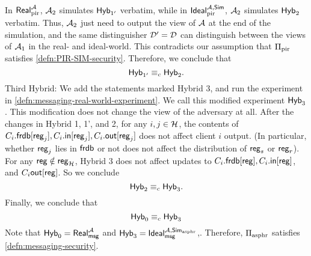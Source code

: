In $\mathsf{Real}_{\text{pir}}^{\mathcal{A}}$, $\mathcal{A}_2$ simulates $\mathsf{Hyb}_{1'}$ verbatim, while in $\mathsf{Ideal}_{\text{pir}}^{\mathcal{A}, \mathsf{Sim}}$, $\mathcal{A}_2$ simulates $\mathsf{Hyb}_2$ verbatim. Thus, $\mathcal{A}_2$ just need to output the view of $\mathcal{A}$ at the end of the simulation, and the same distinguisher $\mathcal{D}' = \mathcal{D}$ can distinguish between the views of $\mathcal{A}_1$ in the real- and ideal-world. This contradicts our assumption that $\Pi_{\text{pir}}$ satisfies \cref{defn:PIR-SIM-security}. Therefore, we conclude that
$$\mathsf{Hyb}_{1'} \equiv_c \mathsf{Hyb}_2.$$
Third Hybrid: We add the statements marked Hybrid 3, and run the experiment in \cref{defn:messaging-real-world-experiment}. We call this modified experiment $\mathsf{Hyb}_{3}$. This modification does not change the view of the adversary at all. After the changes in Hybrid 1, 1', and 2, for any $i, j \in \mathcal{H}$, the contents of $C_i.\mathsf{frdb}[\mathsf{reg}_j], C_i.\mathsf{in}[\mathsf{reg}_j], C_i.\mathsf{out}[\mathsf{reg}_j]$ does not affect client $i$ output. (In particular, whether $\mathsf{reg}_j$ lies in $\mathsf{frdb}$ or not does not affect the distribution of $\mathsf{reg}_s$ or $\mathsf{reg}_r$). For any $\mathsf{reg} \notin \mathsf{reg}_{\mathcal{H}}$, Hybrid 3 does not affect updates to $C_i.\mathsf{frdb}[\mathsf{reg}], C_i.\mathsf{in}[\mathsf{reg}]$, and $C_i\mathsf{out}[\mathsf{reg}]$. So we conclude
$$\mathsf{Hyb}_{2} \equiv_c \mathsf{Hyb}_3.$$
Finally, we conclude that
$$\mathsf{Hyb}_0 \equiv_c \mathsf{Hyb}_3$$
Note that $\mathsf{Hyb}_0 = \mathsf{Real}_{\mathsf{msg}}^{\mathcal{A}}$ and $\mathsf{Hyb}_3 = \mathsf{Ideal}_{\mathsf{msg}}^{\mathcal{A}, \mathsf{Sim}_{\text{asphr}}}$,. Therefore, $\Pi_{\text{asphr}}$ satisfies \cref{defn:messaging-security}.
